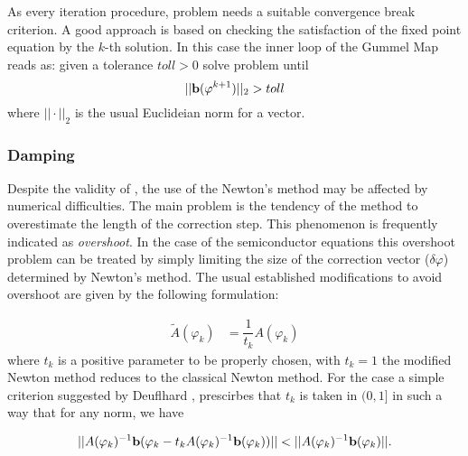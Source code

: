 As every iteration procedure, problem  needs a suitable convergence break criterion. A good approach is based on checking the satisfaction of the fixed point equation  by the $k$-th solution. In this case the inner loop of the Gummel Map reads as: given a tolerance $toll>0$ solve problem  until
\begin{equation}
||\mathbf{b}(\varphi^{k+1})||_2 > toll
\end{equation}
where $||\cdot ||_2$ is the usual Euclideian norm for a vector.

\subsubsection{Damping}

Despite the validity of , the 
use of the Newton's method may be affected by numerical difficulties.
The main problem is the tendency of the method to overestimate the length of the correction step. This phenomenon is frequently indicated as \textit{overshoot}. In the case of the semiconductor equations this overshoot problem can be treated by simply limiting the size of the correction vector ($\delta \varphi$) determined by Newton's method. The usual established modifications to avoid overshoot are given by the following formulation:


\begin{align}
\tilde{A}(\varphi_k)&=\dfrac{1}{t_k}A(\varphi_k) \label{eq: NLP mod used}
\end{align}
where $t_k$ is a positive parameter to be properly chosen, with $t_k=1$ the modified Newton method reduces to the classical Newton method.
For the case  a simple criterion suggested by Deuflhard \cite{DefulhardDamp}, prescirbes that $t_k$ is taken in $(0,1]$ in such a way that for any norm, we have

\begin{equation}
\label{eq: extended criterion}
||A(\varphi_k)^{-1}\vect{b}(\varphi_k-t_kA(\varphi_k)^{-1}\vect{b}(\varphi_k))||<||A(\varphi_k)^{-1}\vect{b}(\varphi_k)||.
\end{equation}

